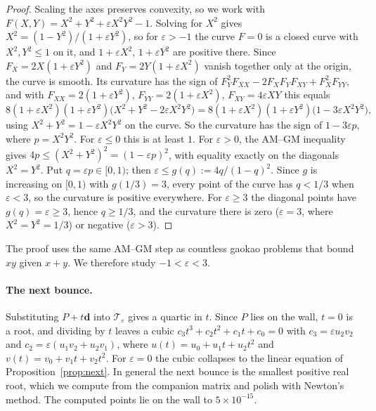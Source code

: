 \documentclass[11pt]{amsart}
\theoremstyle{remark}
\begin{document}
\begin{proof}
Scaling the axes preserves convexity, so we work with
$F(X, Y) = X^2 + Y^2 + \varepsilon X^2Y^2 - 1$. Solving for $X^2$ gives
$X^2 = (1 - Y^2)/(1 + \varepsilon Y^2)$, so for $\varepsilon > -1$ the curve
$F = 0$ is a closed curve with $X^2, Y^2 \le 1$ on it, and $1 + \varepsilon X^2$,
$1 + \varepsilon Y^2$ are positive there. Since $F_X = 2X(1 + \varepsilon Y^2)$
and $F_Y = 2Y(1 + \varepsilon X^2)$ vanish together only at the origin, the
curve is smooth. Its curvature has the sign of
$F_Y^2F_{XX} - 2F_XF_YF_{XY} + F_X^2F_{YY}$, and with
$F_{XX} = 2(1 + \varepsilon Y^2)$, $F_{YY} = 2(1 + \varepsilon X^2)$,
$F_{XY} = 4\varepsilon XY$ this equals
\[
  8(1 + \varepsilon X^2)(1 + \varepsilon Y^2)\bigl(X^2 + Y^2 - 2\varepsilon X^2Y^2\bigr)
  = 8(1 + \varepsilon X^2)(1 + \varepsilon Y^2)\bigl(1 - 3\varepsilon X^2Y^2\bigr),
\]
using $X^2 + Y^2 = 1 - \varepsilon X^2Y^2$ on the curve. So the curvature has
the sign of $1 - 3\varepsilon p$, where $p = X^2Y^2$. For $\varepsilon \le 0$
this is at least $1$. For $\varepsilon > 0$, the AM--GM inequality gives
$4p \le (X^2 + Y^2)^2 = (1 - \varepsilon p)^2$, with equality exactly on the
diagonals $X^2 = Y^2$. Put $q = \varepsilon p \in [0, 1)$; then
$\varepsilon \le g(q) := 4q/(1 - q)^2$. Since $g$ is increasing on $[0, 1)$
with $g(1/3) = 3$, every point of the curve has $q < 1/3$ when
$\varepsilon < 3$, so the curvature is positive everywhere. For
$\varepsilon \ge 3$ the diagonal points have $g(q) = \varepsilon \ge 3$, hence
$q \ge 1/3$, and the curvature there is zero ($\varepsilon = 3$, where
$X^2 = Y^2 = 1/3$) or negative ($\varepsilon > 3$).
\end{proof}

The proof uses the same AM--GM step as countless gaokao problems that bound
$xy$ given $x + y$. We therefore study $-1 < \varepsilon < 3$.

\paragraph{The next bounce.} Substituting $P + t\mathbf d$ into
$\mathcal T_\varepsilon$ gives a quartic in $t$. Since $P$ lies on the wall,
$t = 0$ is a root, and dividing by $t$ leaves a cubic
$c_3t^3 + c_2t^2 + c_1t + c_0 = 0$ with $c_3 = \varepsilon u_2v_2$ and
$c_2 = \varepsilon(u_1v_2 + u_2v_1)$, where $u(t) = u_0 + u_1t + u_2t^2$ and
$v(t) = v_0 + v_1t + v_2t^2$. For $\varepsilon = 0$ the cubic collapses to the
linear equation of Proposition~\ref{prop:next}. In general the next bounce is
the smallest positive real root, which we compute from the companion matrix
and polish with Newton's method. The computed points lie on the wall to
$5\times10^{-15}$.
\end{document}
